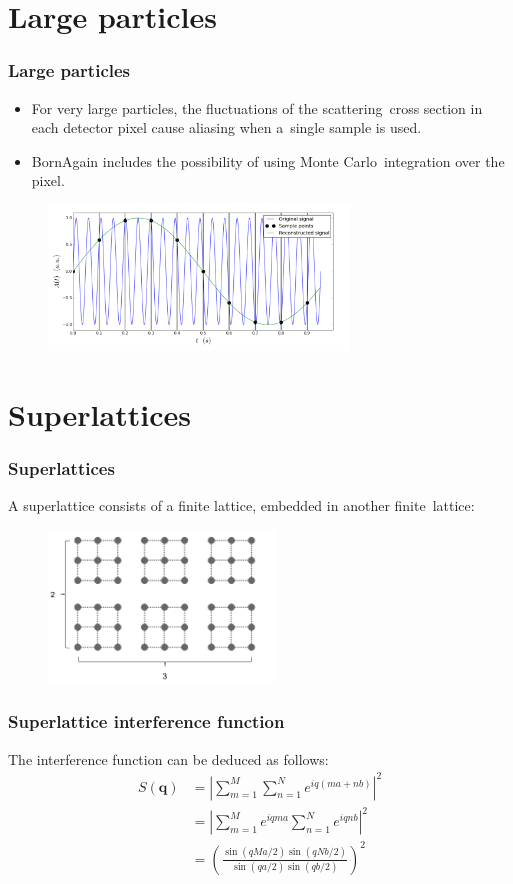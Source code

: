 \documentclass{beamer}
\begin{document}
\section{Large particles}

\begin{frame}
    \frametitle{Large particles}
    \begin{itemize}
        \item For very large particles, the fluctuations of the scattering\
              cross section in each detector pixel cause aliasing when a\
              single sample is used.
        \item BornAgain includes the possibility of using Monte Carlo\
              integration over the pixel.
    \end{itemize}
    \begin{figure}
        \includegraphics[width=8cm]{aliasing.png}
    \end{figure}
\end{frame}

\section{Superlattices}

\begin{frame}
    \frametitle{Superlattices}
    A superlattice consists of a finite lattice, embedded in another finite\
    lattice:
    \begin{figure}
        \includegraphics[width=6cm]{superlattice.png}
    \end{figure}
\end{frame}

\begin{frame}
    \frametitle{Superlattice interference function}
    The interference function can be deduced as follows:
    \begin{align}
        S(\mathbf q) &= \left| \sum_{m=1}^M \sum_{n=1}^N e^{iq(ma+nb)} \right|^2 \nonumber \\
                     &= \left| \sum_{m=1}^M e^{iqma} \sum_{n=1}^N e^{iqnb} \right|^2 \nonumber \\
                     &= \left( \frac{\sin(qMa/2)\sin(qNb/2)}{\sin(qa/2)\sin(qb/2)} \right)^2 \nonumber
    \end{align}
\end{frame}
\end{document}
